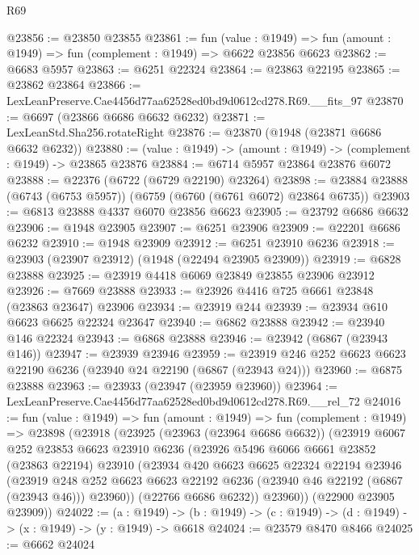 \begin{lexlean}{R69}
\begin{coremodule}
{@23856 := @23850 @23855
@23861 := fun (value : @1949) =>
  fun (amount : @1949) => fun (complement : @1949) => @6622 @23856 @6623
@23862 := @6683 @5957
@23863 := @6251 @22324
@23864 := @23863 @22195
@23865 := @23862 @23864
@23866 := LexLeanPreserve.Cae4456d77aa62528ed0bd9d0612cd278.R69.__fits_97
@23870 := @6697 (@23866 @6686 @6632 @6232)
@23871 := LexLeanStd.Sha256.rotateRight
@23876 := @23870 (@1948 (@23871 @6686 @6632 @6232))
@23880 := (value : @1949) -> (amount : @1949) -> (complement : @1949) -> @23865 @23876
@23884 := @6714 @5957 @23864 @23876 @6072
@23888 := @22376 (@6722 (@6729 @22190) @23264)
@23898 := @23884 @23888 (@6743 (@6753 @5957)) (@6759 (@6760 (@6761 @6072) @23864 @6735))
@23903 := @6813 @23888 @4337 @6070 @23856 @6623
@23905 := @23792 @6686 @6632
@23906 := @1948 @23905
@23907 := @6251 @23906
@23909 := @22201 @6686 @6232
@23910 := @1948 @23909
@23912 := @6251 @23910 @6236
@23918 := @23903 (@23907 @23912) (@1948 (@22494 @23905 @23909))
@23919 := @6828 @23888
@23925 := @23919 @4418 @6069 @23849 @23855 @23906 @23912
@23926 := @7669 @23888
@23933 := @23926 @4416 @725 @6661 @23848 (@23863 @23647) @23906
@23934 := @23919 @244
@23939 := @23934 @610 @6623 @6625 @22324 @23647
@23940 := @6862 @23888
@23942 := @23940 @146 @22324
@23943 := @6868 @23888
@23946 := @23942 (@6867 (@23943 @146))
@23947 := @23939 @23946
@23959 := @23919 @246 @252 @6623 @6623 @22190 @6236 (@23940 @24 @22190 (@6867 (@23943 @24)))
@23960 := @6875 @23888
@23963 := @23933 (@23947 (@23959 @23960))
@23964 := LexLeanPreserve.Cae4456d77aa62528ed0bd9d0612cd278.R69.__rel_72
@24016 := fun (value : @1949) =>
  fun (amount : @1949) =>
  fun (complement : @1949) =>
  @23898
    (@23918
      (@23925
        (@23963 (@23964 @6686 @6632))
        (@23919
          @6067
          @252
          @23853
          @6623
          @23910
          @6236
          (@23926
            @5496
            @6066
            @6661
            @23852
            (@23863 @22194)
            @23910
            (@23934
              @420
              @6623
              @6625
              @22324
              @22194
              @23946
              (@23919
                @248
                @252
                @6623
                @6623
                @22192
                @6236
                (@23940 @46 @22192 (@6867 (@23943 @46)))
                @23960))
            (@22766 @6686 @6232))
          @23960))
      (@22900 @23905 @23909))
@24022 := (a : @1949) ->
  (b : @1949) -> (c : @1949) -> (d : @1949) -> (x : @1949) -> (y : @1949) -> @6618
@24024 := @23579 @8470 @8466
@24025 := @6662 @24024
}
\end{coremodule}
\end{lexlean}
